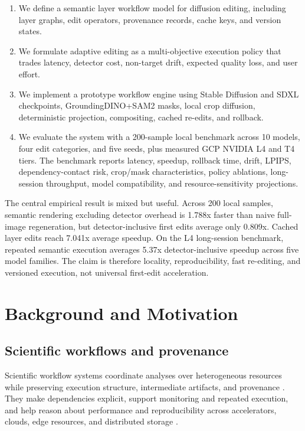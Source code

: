 \documentclass[final,5p,times,number,sort&compress]{elsarticle}
\begin{document}
\begin{enumerate}[leftmargin=*]
    \item We define a semantic layer workflow model for diffusion editing, including layer graphs, edit operators, provenance records, cache keys, and version states.
    \item We formulate adaptive editing as a multi-objective execution policy that trades latency, detector cost, non-target drift, expected quality loss, and user effort.
    \item We implement a prototype workflow engine using Stable Diffusion and SDXL checkpoints, GroundingDINO+SAM2 masks, local crop diffusion, deterministic projection, compositing, cached re-edits, and rollback.
    \item We evaluate the system with a 200-sample local benchmark across 10 models, four edit categories, and five seeds, plus measured GCP NVIDIA L4 and T4 tiers. The benchmark reports latency, speedup, rollback time, drift, LPIPS, dependency-contact risk, crop/mask characteristics, policy ablations, long-session throughput, model compatibility, and resource-sensitivity projections.
\end{enumerate}

The central empirical result is mixed but useful. Across 200 local samples, semantic rendering excluding detector overhead is 1.788x faster than naive full-image regeneration, but detector-inclusive first edits average only 0.809x. Cached layer edits reach 7.041x average speedup. On the L4 long-session benchmark, repeated semantic execution averages 5.37x detector-inclusive speedup across five model families. The claim is therefore locality, reproducibility, fast re-editing, and versioned execution, not universal first-edit acceleration.

\section{Background and Motivation}

\subsection{Scientific workflows and provenance}

Scientific workflow systems coordinate analyses over heterogeneous resources while preserving execution structure, intermediate artifacts, and provenance \citep{deelman2009workflows,deelman2015pegasus}. They make dependencies explicit, support monitoring and repeated execution, and help reason about performance and reproducibility across accelerators, clouds, edge resources, and distributed storage \citep{ferreiradasilva2017characterization,satyanarayanan2017edge}.
\end{document}

